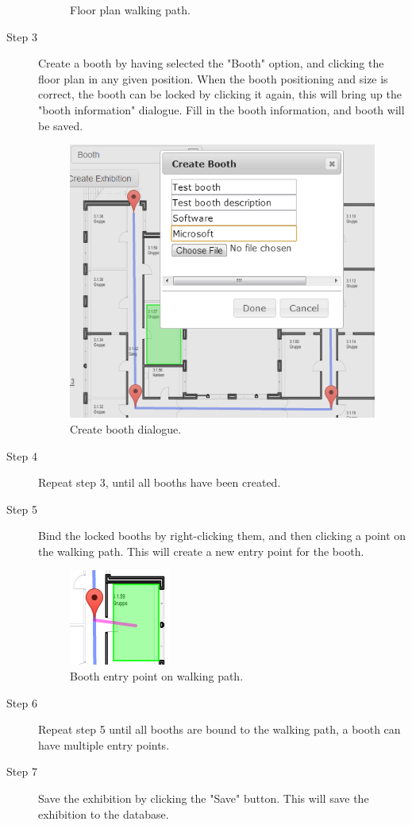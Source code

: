 \begin{description}
\begin{figure}[H]
		\caption{Floor plan walking path.\label{fig:websitestep2}}
	\end{figure}
	\item[Step 3] Create a booth by having selected the "Booth" option, and clicking the floor plan in any given position. When the booth positioning and size is correct, the booth can be locked by clicking it again, this will bring up the "booth information" dialogue. Fill in the booth information, and booth will be saved.
	\begin{figure}[H]
		\centering
		\includegraphics[scale=0.5]{img/website/step4.png}
		\caption{Create booth dialogue.\label{fig:websitestep3}}
	\end{figure}
	\item[Step 4] Repeat step 3, until all booths have been created.
	\item[Step 5] Bind the locked booths by right-clicking them, and then clicking a point on the walking path. This will create a new entry point for the booth.
	\begin{figure}[H]
		\centering
		\includegraphics[scale=0.5]{img/website/step5.png}
		\caption{Booth entry point on walking path.\label{fig:websitestep5}}
	\end{figure}
	\item[Step 6] Repeat step 5 until all booths are bound to the walking path, a booth can have multiple entry points.
	\item[Step 7] Save the exhibition by clicking the "Save" button. This will save the exhibition to the database.
\end{description}
